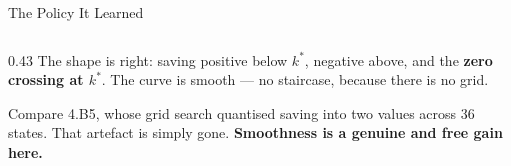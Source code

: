 \begin{frame}{The Policy It Learned}
\begin{columns}[T]
\begin{column}{0.43\textwidth}
The shape is right: saving positive below $k^{*}$, negative above, and the \textbf{zero crossing at $k^{*}$}. The curve is smooth --- no staircase, because there is no grid.
\medskip
\begin{takeawaybox}\footnotesize
Compare 4.B5, whose grid search quantised saving into two values across $36$ states. That artefact is simply gone. \textbf{Smoothness is a genuine and free gain here.}
\end{takeawaybox}
\end{column}
\end{columns}
\vspace{1mm}
\end{frame}

